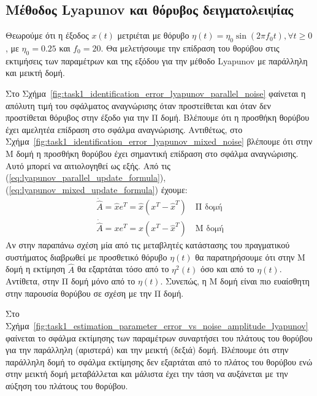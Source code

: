 \documentclass[a4paper,12pt]{article}
\begin{document}
\subsection*{Μέθοδος Lyapunov και θόρυβος δειγματολειψίας}

Θεωρούμε ότι η έξοδος $x(t)$ μετριέται με θόρυβο $\eta(t) = \eta_0 \sin(2\pi f_0 t), \forall t \geq 0$, 
με $\eta_0 = 0.25$ και $f_0 = 20$. Θα μελετήσουμε την επίδραση του θορύβου στις εκτιμήσεις των παραμέτρων
και της εξόδου για την μέθοδο Lyapunov με παράλληλη και μεικτή
δομή.

Στο Σχήμα~\ref{fig:task1_identification_error_lyapunov_parallel_noise} φαίνεται η απόλυτη τιμή του σφάλματος 
αναγνώρισης όταν προστείθεται και όταν δεν προστίθεται θόρυβος στην έξοδο για την Π δομή. Βλέπουμε ότι η 
προσθήκη θορύβου έχει αμελητέα επίδραση στο σφάλμα αναγνώρισης. Αντιθέτως, στο 
Σχήμα~\ref{fig:task1_identification_error_lyapunov_mixed_noise} βλέπουμε ότι στην Μ δομή η προσθήκη θορύβου
έχει σημαντική επίδραση στο σφάλμα αναγνώρισης. Αυτό μπορεί να αιτιολογηθεί ως εξής. Από τις
(\ref{eq:lyapunov_parallel_update_formula}), (\ref{eq:lyapunov_mixed_update_formula}) έχουμε:
\begin{equation*}
    \begin{aligned}
        \dot{\hat{A}} = \hat{x}e^T = \hat{x}(x^T - \hat{x}^T) \quad \text{Π δομή} \\
        \dot{\hat{A}} = xe^T = x(x^T - \hat{x}^T) \quad \text{Μ δομή}
    \end{aligned}
\end{equation*}
Αν στην παραπάνω σχέση μία από τις μεταβλητές κατάστασης του πραγματικού συστήματος διαβρωθεί με προσθετικό
θόρυβο $\eta(t)$ θα παρατηρήσουμε ότι στην Μ δομή η εκτίμηση $\hat{A}$ θα εξαρτάται τόσο από το $\eta^2(t)$
όσο και από το $\eta(t)$. Αντίθετα, στην Π δομή μόνο από το $\eta(t)$. Συνεπώς, η Μ δομή είναι πιο ευαίσθητη
στην παρουσία θορύβου σε σχέση με την Π δομή.

Στο Σχήμα~\ref{fig:task1_estimation_parameter_error_vs_noise_amplitude_lyapunov} φαίνεται το σφάλμα εκτίμησης
των παραμέτρων συναρτήσει του πλάτους του θορύβου για την παράλληλη (αριστερά) και την μεικτή (δεξιά) δομή.
Βλέπουμε ότι στην παράλληλη δομή το σφάλμα εκτίμησης δεν εξαρτάται από το πλάτος του θορύβου ενώ στην μεικτή 
δομή μεταβάλλεται και μάλιστα έχει την τάση να αυξάνεται με την αύξηση του πλάτους του θορύβου.
\end{document}
